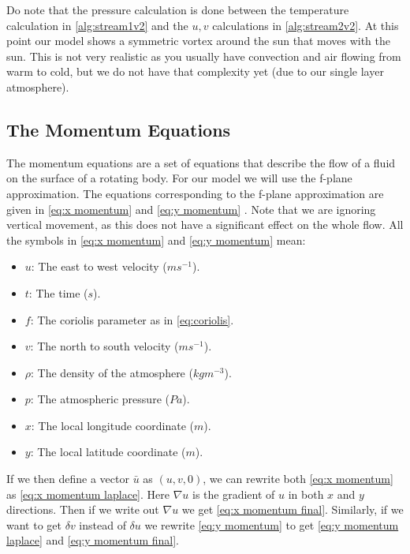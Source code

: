 Do note that the pressure calculation is done between the temperature calculation in \autoref{alg:stream1v2} and the $u, v$ calculations in \autoref{alg:stream2v2}. At this point our model shows
a symmetric vortex around the sun that moves with the sun. This is not very realistic as you usually have convection and air flowing from warm to cold, but we do not have that complexity yet 
(due to our single layer atmosphere).

\subsection{The Momentum Equations} \label{sec:momentum}
The momentum equations are a set of equations that describe the flow of a fluid on the surface of a rotating body. For our model we will use the f-plane approximation. The equations corresponding
to the f-plane approximation are given in \autoref{eq:x momentum} and \autoref{eq:y momentum} \cite{momentumeqs}. Note that we are ignoring vertical movement, as this does not have a significant
effect on the whole flow. All the symbols in \autoref{eq:x momentum} and \autoref{eq:y momentum} mean:

\begin{itemize}
    \item $u$: The east to west velocity ($ms^{-1}$).
    \item $t$: The time ($s$).
    \item $f$: The coriolis parameter as in \autoref{eq:coriolis}.
    \item $v$: The north to south velocity ($ms^{-1}$).
    \item $\rho$: The density of the atmosphere ($kgm^{-3}$).
    \item $p$: The atmospheric pressure ($Pa$).
    \item $x$: The local longitude coordinate ($m$).
    \item $y$: The local latitude coordinate ($m$).
\end{itemize}

If we then define a vector $\bar{u}$ as $(u, v, 0)$, we can rewrite both \autoref{eq:x momentum} as \autoref{eq:x momentum laplace}. Here $\nabla u$ is the gradient of 
$u$ in both $x$ and $y$ directions. Then if we write out $\nabla u$ we get \autoref{eq:x momentum final}. Similarly, if we want to get $\delta v$ instead of $\delta u$ we rewrite 
\autoref{eq:y momentum} to get \autoref{eq:y momentum laplace} and \autoref{eq:y momentum final}.

